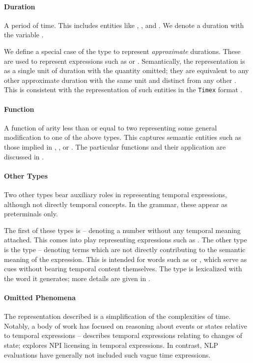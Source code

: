 \paragraph{Duration}
A period of time.
This includes entities like , , and .
We denote a duration with the variable \dur.

We define a special case of the  type to represent 
	\textit{approximate} durations.
These are used to represent expressions such as  or
	.
Semantically, the representation is as a single unit of duration with the
	quantity omitted; they are equivalent to any other approximate
	duration with the same unit and distinct from any other .
This is consistent with the representation of such entities in the
	\texttt{Timex} format \cite{key:2003pustejovsky-timeml}.

\paragraph{Function}
A function of arity less than or equal to two representing some
	general modification to one of the above types.
This captures semantic entities such as those implied in
	, , or .
The particular functions and their application are discussed in 
	.


\paragraph{Other Types}
Two other types bear auxiliary roles in representing temporal expressions,
	although not directly temporal concepts.
In the grammar, these appear as preterminals only.

The first of these types is  -- denoting a number without
	any temporal meaning attached.
This comes into play representing expressions such as .
The other type is the  type -- denoting terms which are not
	directly contributing to the semantic meaning of the expression.
This is intended for words such as  or , which serve as cues
	without bearing temporal content themselves.
The  type is lexicalized with the word it generates; more details
	are given in .


\paragraph{Omitted Phenomena}
The representation described is a simplification of the complexities of
	time.
Notably, a body of work has focused on reasoning about events or states
	relative to temporal expressions -- 
	 describes temporal expressions relating to
	changes of state; 
	 explores NPI licensing in temporal
	expressions.
In contrast, NLP evaluations have generally not included such vague 
	time expressions.

